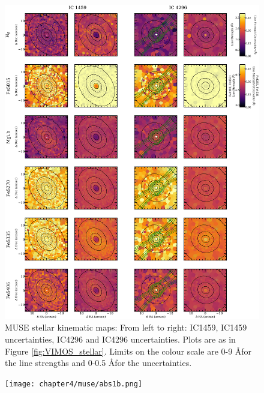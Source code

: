 		\begin{figure}
			\centering
			\includegraphics[height=0.94\textheight]{chapter4/muse/abs1.png}
			\caption[MUSE absorption line strength maps]{MUSE stellar kinematic maps: From left to right: IC1459, IC1459 uncertainties, IC4296 and IC4296 uncertainties. Plots are as in Figure \ref{fig:VIMOS_stellar}. Limits on the colour scale are 0-9 \AA  for the line strengths and 0-0.5 \AA  for the uncertainties.}
			\label{fig:MUSE_absorption}
		\end{figure}
		\begin{figure}
			\centering
			\texttt{[image: chapter4/muse/abs1b.png]}
		\end{figure}
